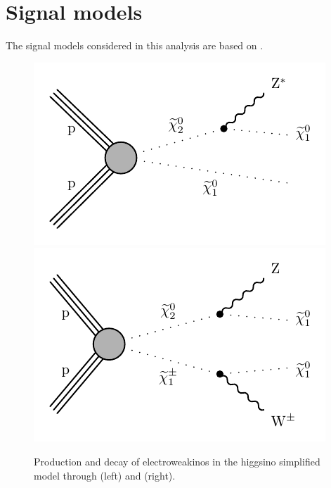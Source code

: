 \section{Signal models}

The signal models considered in this analysis are based on  .

\begin{figure}[h]
\centering
\includegraphics[width=0.48\linewidth]{plots/feynman_diagrams/gitTChiZ.pdf} \,
\includegraphics[width=0.48\linewidth]{plots/feynman_diagrams/gitTChiWZ.pdf}  \\
\caption[Signal Models Feynman Diagrams]{Production and decay of electroweakinos in the higgsino simplified model through \tchiz (left) and \tchiwz (right). }
\label{fig:signal-feynman-diagrams}
\end{figure}

